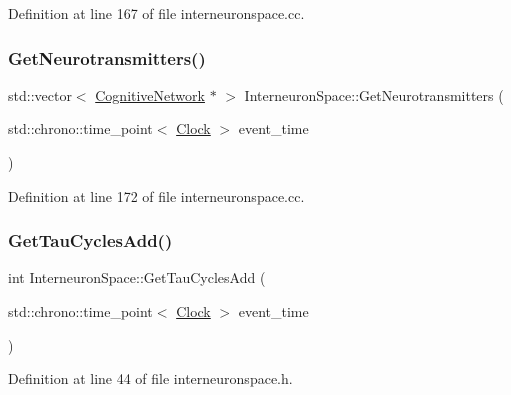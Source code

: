 Definition at line 167 of file interneuronspace.\+cc.

\mbox{\label{class_interneuron_space_aaae45b76a4c059aae1e27bde3901371c}} 
\subsubsection{\texorpdfstring{Get\+Neurotransmitters()}{GetNeurotransmitters()}}
{\footnotesize\ttfamily std\+::vector$<$ \mbox{\hyperlink{class_cognitive_network}{Cognitive\+Network}} $\ast$ $>$ Interneuron\+Space\+::\+Get\+Neurotransmitters (\begin{DoxyParamCaption}\item[{std\+::chrono\+::time\+\_\+point$<$ \mbox{\hyperlink{universe_8h_a0ef8d951d1ca5ab3cfaf7ab4c7a6fd80}{Clock}} $>$}]{event\+\_\+time }\end{DoxyParamCaption})}



Definition at line 172 of file interneuronspace.\+cc.

\mbox{\label{class_interneuron_space_abd37d409a97acca62d11576314bdfcf4}} 
\subsubsection{\texorpdfstring{Get\+Tau\+Cycles\+Add()}{GetTauCyclesAdd()}}
{\footnotesize\ttfamily int Interneuron\+Space\+::\+Get\+Tau\+Cycles\+Add (\begin{DoxyParamCaption}\item[{std\+::chrono\+::time\+\_\+point$<$ \mbox{\hyperlink{universe_8h_a0ef8d951d1ca5ab3cfaf7ab4c7a6fd80}{Clock}} $>$}]{event\+\_\+time }\end{DoxyParamCaption})\hspace{0.3cm}{\ttfamily [inline]}}



Definition at line 44 of file interneuronspace.\+h.

\mbox{\label{class_interneuron_space_a1024eadca0b56be9b54593ea47c5879f}} 
